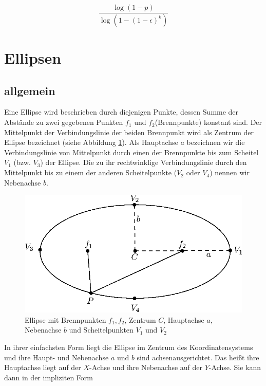 \begin{equation}
\frac{\log{\left(1-p\right)}}{\log{\left(1-\left(1-\epsilon\right)^k\right)}}
\end{equation}


\section{Ellipsen}
\label{s:ellipse}
\subsection{allgemein}
\label{s:ellipseGeneral}

\begin{definition}[Ellipse]
	Eine Ellipse wird beschrieben durch diejenigen Punkte, dessen Summe der Abstände zu zwei gegebenen Punkten $f_1$ und $f_2$(Brennpunkte) konstant sind. Der Mittelpunkt der Verbindungslinie der beiden Brennpunkt wird als Zentrum der Ellipse bezeichnet (siehe Abbildung \ref{fig:ellipseDef}). 
	Als Hauptachse $a$ bezeichnen wir die Verbindungslinie von Mittelpunkt durch einen der Brennpunkte bis zum Scheitel $V_1$ (bzw. $V_3$) der Ellipse. Die zu ihr rechtwinklige Verbindungslinie durch den Mittelpunkt bis zu einem der anderen Scheitelpunkte ($V_2$ oder $V_4$) nennen wir Nebenachse $b$.
\end{definition}

\begin{figure}[!htb]
	\centering
	\includegraphics[scale=.8]{images/ellipse_focalDef.eps}
	\caption{Ellipse mit Brennpunkten $f_1, f_2$, Zentrum $C$, Hauptachse $a$, Nebenachse $b$ und Scheitelpunkten $V_1$ und $V_2$}
	\label{fig:ellipseDef}
\end{figure}

In ihrer einfachsten Form liegt die Ellipse im Zentrum des Koordinatensystems und ihre Haupt- und Nebenachse $a$ und $b$ sind achsenausgerichtet. Das heißt ihre Hauptachse liegt auf der $X$-Achse und ihre Nebenachse auf der $Y$-Achse. Sie kann dann in der impliziten Form


